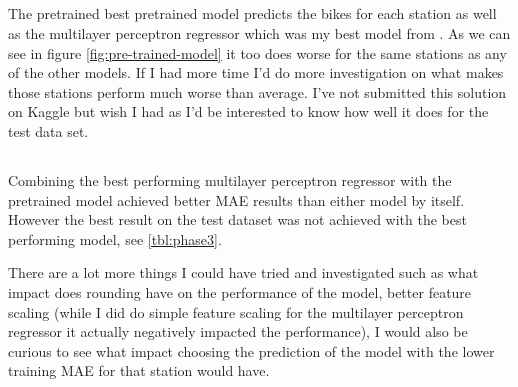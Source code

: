 \documentclass[a4paper]{article}
\begin{document}
        \subsection*{}
        The pretrained best pretrained model predicts the bikes for each station as well as the multilayer perceptron regressor
        which was my best model from .
        As we can see in figure \ref{fig:pre-trained-model} it too does worse for the same stations as any of the other models.
        If I had more time I'd do more investigation on what makes those stations perform much worse than average. I've not
        submitted this solution on Kaggle but wish I had as I'd be interested to know how well it does for the test data set.

        \subsection*{}
        Combining the best performing multilayer perceptron regressor with the pretrained model achieved better MAE results than
        either model by itself. However the best result on the test dataset was not achieved with the best performing model,
        see \ref{tbl:phase3}.

        There are a lot more things I could have tried and investigated such as what impact does rounding have on the performance
        of the model, better feature scaling (while I did do simple feature scaling for the multilayer perceptron regressor it actually
        negatively impacted the performance), I would also be curious to see what impact choosing the prediction of the model
        with the lower training MAE for that station would have.





        
        
\end{document}
